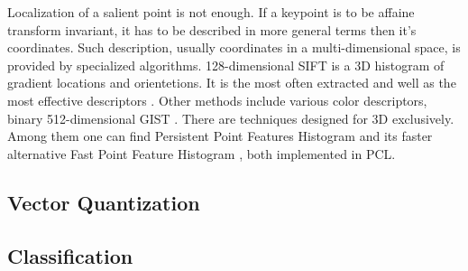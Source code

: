 \documentclass[a4paper,12pt]{article}
\begin{document}
	Localization of a salient point is not enough. If a keypoint is to be affaine transform invariant, it has to be described in more general terms then it's coordinates. Such description, usually coordinates in a multi-dimensional space, is provided by specialized algorithms. 128-dimensional SIFT \cite{sift_features} is a 3D histogram of gradient locations and orientetions. It is the most often extracted and well as the most effective descriptors \cite{tsai2012bag}. Other methods include various color descriptors, binary 512-dimensional GIST \cite{ponce2011cv}. There are techniques designed for 3D exclusively. Among them one can find Persistent Point Features Histogram \cite{pfh_rusu2008} and its faster alternative Fast Point Feature Histogram \cite{fpfh_rusu2009}, both implemented in PCL.

\subsection{Vector Quantization}
\subsection{Classification}


\end{document}
